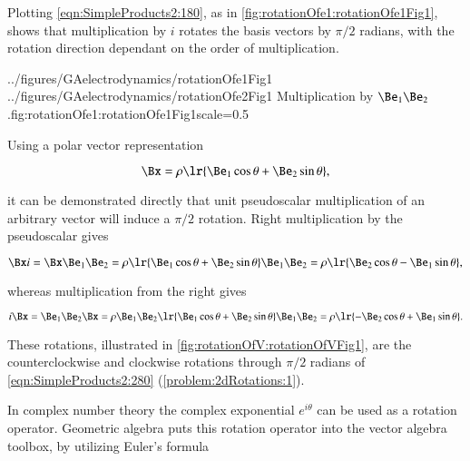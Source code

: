%
%

Plotting \cref{eqn:SimpleProducts2:180}, as in
\cref{fig:rotationOfe1:rotationOfe1Fig1},
 shows that multiplication by \( i \) rotates the  basis vectors by \( \pi/2 \) radians,
with the
rotation direction dependant on the order of multiplication.

\imageTwoFigures
{../figures/GAelectrodynamics/rotationOfe1Fig1}
{../figures/GAelectrodynamics/rotationOfe2Fig1}
{Multiplication by \( \Be_1 \Be_2 \).}{fig:rotationOfe1:rotationOfe1Fig1}{scale=0.5}

Using a polar vector representation

\begin{dmath}\label{eqn:SimpleProducts2:280}
   \Bx = \rho \lr{ \Be_1 \cos\theta + \Be_2 \sin\theta },
\end{dmath}

it can be
demonstrated directly that
unit pseudoscalar multiplication of an arbitrary vector will induce a \( \pi/2 \) rotation.
Right multiplication by the pseudoscalar gives

\begin{dmath}\label{eqn:SimpleProducts2:300}
\Bx i
= \Bx \Be_1 \Be_2
= \rho \lr{ \Be_1 \cos\theta + \Be_2 \sin\theta } \Be_1 \Be_2
= \rho \lr{ \Be_2 \cos\theta - \Be_1 \sin\theta },
\end{dmath}

whereas multiplication from the right gives

\begin{dmath}\label{eqn:2dRotations:3}
i \Bx
= \Be_1 \Be_2 \Bx
= \rho \Be_1 \Be_2 \lr{ \Be_1 \cos\theta + \Be_2 \sin\theta } \Be_1 \Be_2
= \rho \lr{ -\Be_2 \cos\theta + \Be_1 \sin\theta }.
\end{dmath}

These rotations,
illustrated in \cref{fig:rotationOfV:rotationOfVFig1},
 are
the counterclockwise and clockwise rotations through \( \pi/2 \) radians of \cref{eqn:SimpleProducts2:280}
(\cref{problem:2dRotations:1}).


In complex number theory the complex exponential \( e^{i\theta} \) can be used as a rotation operator.
Geometric algebra puts this rotation operator into the vector algebra toolbox, by utilizing
Euler's formula

